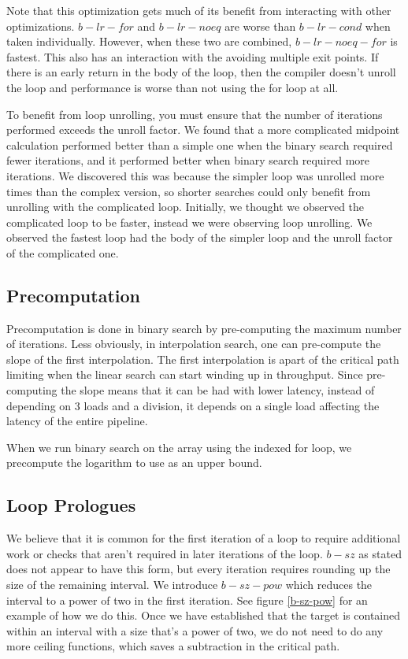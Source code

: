 \documentclass[twocolumn]{article}
\begin{document}
Note that this optimization gets much of its benefit from interacting with other optimizations. $b-lr-for$ and $b-lr-noeq$ are worse than $b-lr-cond$ when taken individually. However, when these two are combined, $b-lr-noeq-for$ is fastest. This also has an interaction with the avoiding multiple exit points. If there is an early return in the body of the loop, then the compiler doesn't unroll the loop and performance is worse than not using the for loop at all.

To benefit from loop unrolling, you must ensure that the number of iterations performed exceeds the unroll factor. We found that a more complicated midpoint calculation performed better than a simple one when the binary search required fewer iterations, and it performed better when binary search required more iterations. We discovered this was because the simpler loop was unrolled more times than the complex version, so shorter searches could only benefit from unrolling with the complicated loop. Initially, we thought we observed the complicated loop to be faster, instead we were observing loop unrolling. We observed the fastest loop had the body of the simpler loop and the unroll factor of the complicated one.


\subsection{Precomputation}
Precomputation is done in binary search by pre-computing the maximum number of iterations. Less obviously, in interpolation search, one can pre-compute the slope of the first interpolation. The first interpolation is apart of the critical path limiting when the linear search can start winding up in throughput. Since pre-computing the slope means that it can be had with lower latency, instead of depending on 3 loads and a division, it depends on a single load affecting the latency of the entire pipeline.

When we run binary search on the array using the indexed for loop, we precompute the logarithm to use as an upper bound.

\subsection{Loop Prologues}
We believe that it is common for the first iteration of a loop to require additional work or checks that aren't required in later iterations of the loop. $b-sz$ as stated does not appear to have this form, but every iteration requires rounding up the size of the remaining interval. We introduce $b-sz-pow$ which reduces the interval to a power of two in the first iteration. See figure \ref{b-sz-pow} for an example of how we do this. Once we have established that the target is contained within an interval with a size that's a power of two, we do not need to do any more ceiling functions, which saves a subtraction in the critical path.
\end{document}
